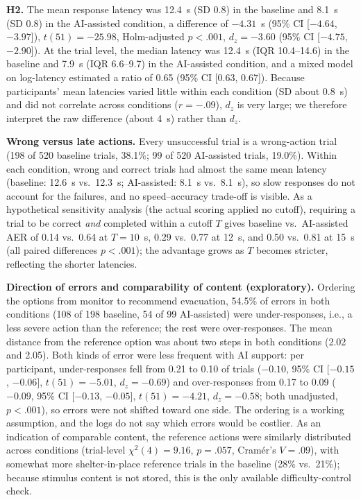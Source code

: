 \documentclass[journal]{IEEEtran}
\theoremstyle{plain}
\theoremstyle{definition}
\begin{document}
    \textbf{H2.} The mean response latency was 12.4~s (SD 0.8) in the baseline and 8.1~s (SD 0.8) in the AI-assisted condition, a difference of $-4.31$~s (95\% CI [$-4.64$, $-3.97$]), $t(51)=-25.98$, Holm-adjusted $p<.001$, $d_z=-3.60$ (95\% CI [$-4.75$, $-2.90$]). At the trial level, the median latency was 12.4~s (IQR 10.4--14.6) in the baseline and 7.9~s (IQR 6.6--9.7) in the AI-assisted condition, and a mixed model on log-latency estimated a ratio of 0.65 (95\% CI [0.63, 0.67]). Because participants' mean latencies varied little within each condition (SD about 0.8~s) and did not correlate across conditions ($r=-.09$), $d_z$ is very large; we therefore interpret the raw difference (about 4~s) rather than $d_z$.

    \textbf{Wrong versus late actions.} Every unsuccessful trial is a wrong-action trial (198 of 520 baseline trials, 38.1\%; 99 of 520 AI-assisted trials, 19.0\%). Within each condition, wrong and correct trials had almost the same mean latency (baseline: 12.6~s vs.\ 12.3~s; AI-assisted: 8.1~s vs.\ 8.1~s), so slow responses do not account for the failures, and no speed--accuracy trade-off is visible. As a hypothetical sensitivity analysis (the actual scoring applied no cutoff), requiring a trial to be correct \emph{and} completed within a cutoff $T$ gives baseline vs.\ AI-assisted AER of 0.14 vs.\ 0.64 at $T=10$~s, 0.29 vs.\ 0.77 at 12~s, and 0.50 vs.\ 0.81 at 15~s (all paired differences $p<.001$); the advantage grows as $T$ becomes stricter, reflecting the shorter latencies.

    \textbf{Direction of errors and comparability of content (exploratory).} Ordering the options from monitor to recommend evacuation, 54.5\% of errors in both conditions (108 of 198 baseline, 54 of 99 AI-assisted) were under-responses, i.e., a less severe action than the reference; the rest were over-responses. The mean distance from the reference option was about two steps in both conditions (2.02 and 2.05). Both kinds of error were less frequent with AI support: per participant, under-responses fell from 0.21 to 0.10 of trials ($-0.10$, 95\% CI [$-0.15$, $-0.06$], $t(51)=-5.01$, $d_z=-0.69$) and over-responses from 0.17 to 0.09 ($-0.09$, 95\% CI [$-0.13$, $-0.05$], $t(51)=-4.21$, $d_z=-0.58$; both unadjusted, $p<.001$), so errors were not shifted toward one side. The ordering is a working assumption, and the logs do not say which errors would be costlier. As an indication of comparable content, the reference actions were similarly distributed across conditions (trial-level $\chi^2(4)=9.16$, $p=.057$, Cram\'er's $V=.09$), with somewhat more shelter-in-place reference trials in the baseline (28\% vs.\ 21\%); because stimulus content is not stored, this is the only available difficulty-control check.
\end{document}
